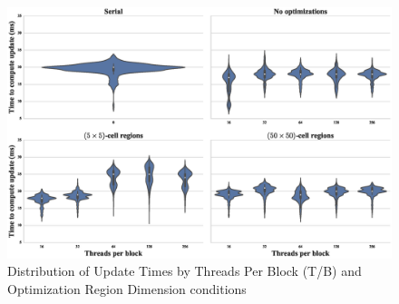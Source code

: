 \documentclass[onecolumn,12pt]{IEEEtran}
\begin{document}
  \begin{figure}[t]
    \centering
      \includegraphics[width=\textwidth]{../images/boxplot.eps}
    \caption{Distribution of Update Times by Threads Per Block (T/B) and Optimization Region Dimension conditions}
    \label{fig:boxplots}
  \end{figure}
\end{document}
